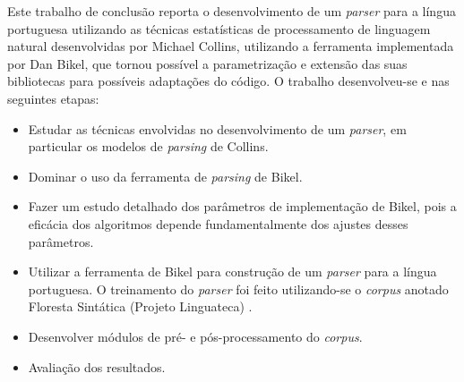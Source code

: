 Este trabalho de conclusão reporta o desenvolvimento de um \emph{parser} para a língua portuguesa utilizando as técnicas estatísticas de processamento de linguagem natural desenvolvidas por Michael Collins, utilizando a ferramenta implementada por Dan Bikel, que tornou possível a parametrização e extensão das suas bibliotecas para possíveis adaptações do código. O trabalho desenvolveu-se e nas seguintes etapas:

\begin{itemize}
	\item Estudar as técnicas envolvidas no desenvolvimento de um \emph{parser}, em particular os modelos de \emph{parsing} de Collins.
	\item Dominar o uso da ferramenta de \emph{parsing} de Bikel.
	\item Fazer um estudo detalhado dos parâmetros de implementação de Bikel, pois a eficácia dos algoritmos depende fundamentalmente dos ajustes desses parâmetros.
	\item Utilizar a ferramenta de Bikel para construção de um \emph{parser} para a língua portuguesa. O treinamento do \emph{parser} foi feito utilizando-se o \emph{corpus} anotado Floresta Sintática (Projeto Linguateca) \cite{florestasintatica}.
	\item Desenvolver módulos de pré- e pós-processamento do \emph{corpus}.
	\item Avaliação dos resultados.

\end{itemize}


